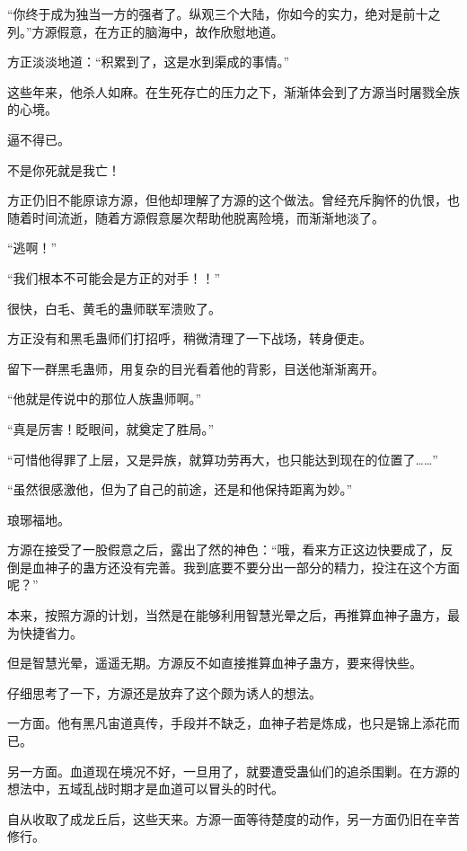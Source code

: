 
\begin{this_body}



“你终于成为独当一方的强者了。纵观三个大陆，你如今的实力，绝对是前十之列。”方源假意，在方正的脑海中，故作欣慰地道。

方正淡淡地道：“积累到了，这是水到渠成的事情。”

这些年来，他杀人如麻。在生死存亡的压力之下，渐渐体会到了方源当时屠戮全族的心境。

逼不得已。

不是你死就是我亡！

方正仍旧不能原谅方源，但他却理解了方源的这个做法。曾经充斥胸怀的仇恨，也随着时间流逝，随着方源假意屡次帮助他脱离险境，而渐渐地淡了。

“逃啊！”

“我们根本不可能会是方正的对手！！”

很快，白毛、黄毛的蛊师联军溃败了。

方正没有和黑毛蛊师们打招呼，稍微清理了一下战场，转身便走。

留下一群黑毛蛊师，用复杂的目光看着他的背影，目送他渐渐离开。

“他就是传说中的那位人族蛊师啊。”

“真是厉害！眨眼间，就奠定了胜局。”

“可惜他得罪了上层，又是异族，就算功劳再大，也只能达到现在的位置了……”

“虽然很感激他，但为了自己的前途，还是和他保持距离为妙。”

琅琊福地。

方源在接受了一股假意之后，露出了然的神色：“哦，看来方正这边快要成了，反倒是血神子的蛊方还没有完善。我到底要不要分出一部分的精力，投注在这个方面呢？”

本来，按照方源的计划，当然是在能够利用智慧光晕之后，再推算血神子蛊方，最为快捷省力。

但是智慧光晕，遥遥无期。方源反不如直接推算血神子蛊方，要来得快些。

仔细思考了一下，方源还是放弃了这个颇为诱人的想法。

一方面。他有黑凡宙道真传，手段并不缺乏，血神子若是炼成，也只是锦上添花而已。

另一方面。血道现在境况不好，一旦用了，就要遭受蛊仙们的追杀围剿。在方源的想法中，五域乱战时期才是血道可以冒头的时代。

自从收取了成龙丘后，这些天来。方源一面等待楚度的动作，另一方面仍旧在辛苦修行。


\end{this_body}
